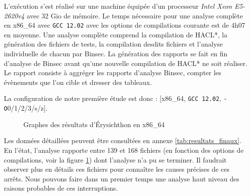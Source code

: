 L'exécution s'est réalisé sur une machine équipée d'un processeur \textit{Intel Xeon E5-2620v4} avec 32 Gio de mémoire. Le temps nécessaire pour une analyse complète en x86\_64 avec \texttt{GCC 12.02} avec les options de compilations courante est de 4h07 en moyenne. Une analyse complète comprend la compilation de HACL*, la génération des fichiers de tests, la compilation desdits fichiers et l'analyse individuelle de chacun par Binsec. La génération des rapports se fait en fin d'analyse de Binsec avant qu'une nouvelle compilation de HACL* ne soit réaliser. Le rapport consiste à aggréger les rapports d'analyse Binsec, compter les évènements que l'on cible et dresser des tableaux.\medbreak

La configuration de notre première étude est donc : [x86\_64, \texttt{GCC 12.02}, \texttt{-O}0/1/2/3/s/z].\medbreak

\begin{figure}[!ht]
  \centering
  \caption{Graphes des résultats d'Érysichthon en x86\_64}
  \label{fig:graphe_total}
\end{figure}


Les données détaillées peuvent être consultées en annexe \ref{tab:resultats_finaux}. En l'état, l'analyse rapporte entre 139 et 168 fichiers (en fonction des options de compilations, voir la figure \ref{fig:graphe_total}) dont l'analyse n'a pu se terminer. Il faudrait observer plus en détails ces fichiers pour connaître les causes précises de ces arrêts. Nous pouvons faire dans un premier temps une analyse haut niveau des raisons probables de ces interruptions. \medbreak

